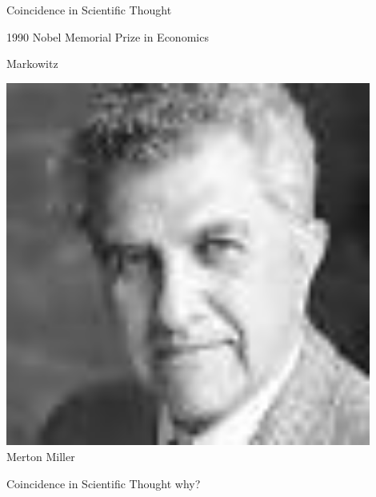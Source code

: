 \documentclass{beamer}
\newcommand{\chuhao}{\fontsize{44.9pt}{\baselineskip}\selectfont}
\begin{document}
\begin{frame}{Coincidence in Scientific Thought}
\begin{block}{1990 Nobel Memorial Prize in Economics}
\begin{minipage}[t]{0.3\textwidth}
			Markowitz
		\end{minipage}
		\begin{minipage}[t]{0.3\textwidth}
			\centering
			\includegraphics[width=0.9\textwidth]{Merton.jpg}\\
			Merton Miller
		\end{minipage}
	\end{block}
\end{frame}
\begin{frame}{Coincidence in Scientific Thought}
	\chuhao{}why?
\end{frame}
\end{document}
